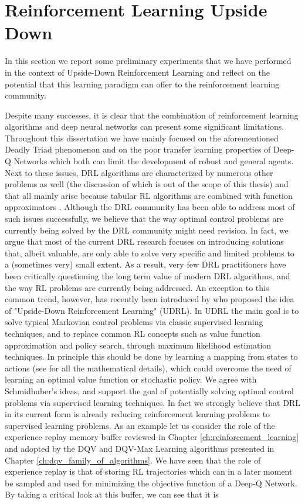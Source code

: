 \section{Reinforcement Learning Upside Down}
In this section we report some preliminary experiments that we have performed in the context of Upside-Down Reinforcement Learning and reflect on the potential that this learning paradigm can offer to the reinforcement learning community. 

Despite many successes, it is clear that the combination of reinforcement learning algorithms and deep neural networks can present some significant limitations. Throughout this dissertation we have mainly focused on the aforementioned Deadly Triad phenomenon and on the poor transfer learning properties of Deep-Q Networks which both can limit the development of robust and general agents. Next to these issues, DRL algorithms are characterized by numerous other problems as well (the discussion of which is out of the scope of this thesis) and that all mainly arise because tabular RL algorithms are combined with function approximators \cite{tsitsiklis1997analysis,van2016deep,anschel2017averaged,fujimoto2018addressing,fujimoto2019benchmarking, kumar2019stabilizing, marklundexact}. Although the DRL community has been able to address most of such issues successfully, we believe that the way optimal control problems are currently being solved by the DRL community might need revision. In fact, we argue that most of the current DRL research focuses on introducing solutions that, albeit valuable, are only able to solve very specific and limited problems to a (sometimes very) small extent. As a result, very few DRL practitioners have been critically questioning the long term value of modern DRL algorithms, and the way RL problems are currently being addressed. An exception to this common trend, however, has recently been introduced by \citet{schmidhuber2019reinforcement} who proposed the idea of "Upside-Down Reinforcement Learning" (UDRL). In UDRL the main goal is to solve typical Markovian control problems via classic supervised learning techniques, and to replace common RL concepts such as value function approximation and policy search, through maximum likelihood estimation techniques. In principle this should be done by learning a mapping from states to actions (see \cite{srivastava2019training} for all the mathematical details), which could overcome the need of learning an optimal value function or stochastic policy. We agree with Schmidhuber's ideas, and support the goal of potentially solving optimal control problems via supervised learning techniques. In fact we strongly believe that DRL in its current form is already reducing reinforcement learning problems to supervised learning problems. As an example let us consider the role of the experience replay memory buffer reviewed in Chapter \ref{ch:reinforcement_learning} and adopted by the DQV and DQV-Max Learning algorithms presented in Chapter \ref{ch:dqv_family_of_algorithms}. We have seen that the role of experience replay is that of storing RL trajectories which can in a later moment be sampled and used for minimizing the objective function of a Deep-Q Network. By taking a critical look at this buffer, we can see that it is 
